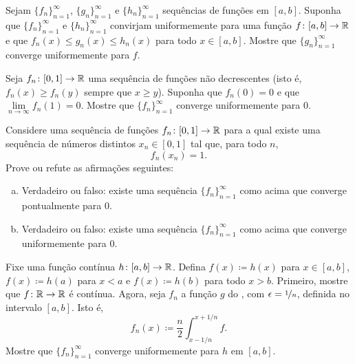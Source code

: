 \begin{exercise}
Sejam $\{ f_n \}_{n=1}^\infty$, $\{ g_n \}_{n=1}^\infty$ e
$\{ h_n \}_{n=1}^\infty$ sequências de funções em $[a,b]$. Suponha que
$\{ f_n \}_{n=1}^\infty$ e $\{ h_n \}_{n=1}^\infty$ convirjam
uniformemente para uma função $f \colon [a,b] \to {\mathbb{R}}$ e que
$f_n(x) \leq g_n(x) \leq h_n(x)$ para todo $x \in [a,b]$. Mostre que
$\{ g_n \}_{n=1}^\infty$ converge uniformemente para $f$.
\end{exercise}

\begin{exercise}
Seja $f_n \colon [0,1] \to {\mathbb{R}}$ uma sequência de funções não decrescentes (isto
é, $f_n(x) \geq f_n(y)$ sempre que $x \geq y$). Suponha que $f_n(0) = 0$
e que $\lim\limits_{n \to \infty} f_n(1) = 0$. Mostre que
$\{ f_n \}_{n=1}^\infty$ converge uniformemente para $0$.
\end{exercise}

\begin{exercise}
Considere uma sequência de funções $f_n \colon [0,1] \to {\mathbb{R}}$ para a qual
existe uma sequência de números distintos $x_n \in [0,1]$ tal que, para
todo $n$,
\begin{equation*}
f_n(x_n) = 1.
\end{equation*}
Prove ou refute as afirmações seguintes:
\begin{enumerate}[a)]
\item
Verdadeiro ou falso: existe uma sequência $\{ f_n \}_{n=1}^\infty$ como
acima que converge pontualmente para $0$.
\item
Verdadeiro ou falso: existe uma sequência $\{ f_n \}_{n=1}^\infty$ como
acima que converge uniformemente para $0$.
\end{enumerate}
\end{exercise}

\begin{exercise}
Fixe uma função contínua $h \colon [a,b] \to {\mathbb{R}}$.
Defina $f(x) \coloneqq h(x)$ para $x \in [a,b]$,
$f(x) \coloneqq h(a)$ para $x < a$ e $f(x) \coloneqq h(b)$ para todo
$x > b$. Primeiro, mostre que $f \colon {\mathbb{R}} \to {\mathbb{R}}$ é contínua.
Agora, seja $f_n$ a função $g$ do
, com $\epsilon = \nicefrac{1}{n}$,
definida no intervalo $[a,b]$. Isto é,
\begin{equation*}
f_n(x) \coloneqq \frac{n}{2} \int_{x-1/n}^{x+1/n} f .
\end{equation*}
Mostre que $\{ f_n \}_{n=1}^\infty$ converge uniformemente para $h$ em $[a,b]$.
\end{exercise}



